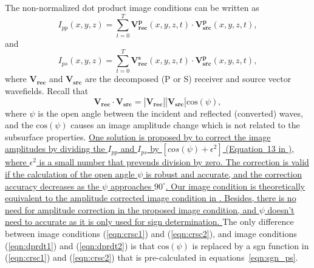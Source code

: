 \documentclass[manuscript,ulem,graphix,revised]{geophysics}
\begin{document}
The non-normalized dot product image conditions can be written as
\begin{equation}
I_{pp}(x,y,z)=\sum_{t=0}^{T}\mathbf{V^p_{rec}}(x,y,z,t)\cdot \mathbf{V^p_{src}}(x,y,z,t),
\label{eqn:dprdt1}
\end{equation}
and
\begin{equation}
I_{ps}(x,y,z)=\sum_{t=0}^{T}\mathbf{V^s_{rec}}(x,y,z,t)\cdot \mathbf{V^p_{src}}(x,y,z,t),
\label{eqn:dprdt2}
\end{equation}
where $\mathbf{V_{rec}}$ and $\mathbf{V_{src}}$ are the decomposed (P or S) receiver and source vector wavefields. Recall that 
\begin{equation}
\mathbf{V_{rec}}\cdot \mathbf{V_{src}}=|\mathbf{V_{rec}}||\mathbf{V_{src}}|\mathrm{cos}(\psi),
\label{eqn:a3}
\end{equation}
where $\psi$ is the open angle between the incident and reflected (converted) waves, and the $\mathrm{cos}(\psi)$ causes an image amplitude change which is not related to the subsurface properties. 
\marginpar{[4]}\uline{One solution is proposed by \mbox{\citet{du17}} to correct the image amplitudes by dividing the $I_{pp}$ and $I_{ps}$ by $[cos(\psi) + \epsilon^2]$ (Equation~13 in \mbox{\citet{du17}}), where $\epsilon^2$ is a small number that prevends division by zero. The correction is valid if the calculation of the open angle $\psi$ is robust and accurate, and the correction accuracy decreases as the $\psi$ approaches $90^\circ$.
Our image condition is theoretically equivalent to the amplitude corrected image condition in \mbox{\citet{du17}}. Besides, there is no need for amplitude correction in the proposed image condition, and $\psi$ doesn't need to accurate as it is only used for sign determination. }
The only difference between image conditions (\ref{eqn:crsc1}) and (\ref{eqn:crsc2}), and image conditions (\ref{eqn:dprdt1}) and (\ref{eqn:dprdt2}) is that $\mathrm{cos}(\psi)$ is replaced by a sgn function in (\ref{eqn:crsc1}) and (\ref{eqn:crsc2}) that is pre-calculated in equations~\ref{eqn:sgn_ps}.


\newpage


\end{document}
